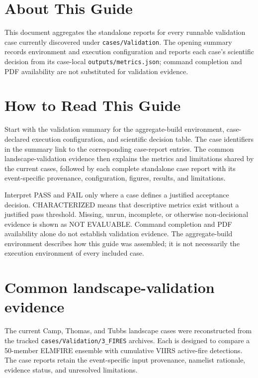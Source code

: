 \documentclass[12pt]{article}
\begin{document}
\newcommand{\GuideTitle}{ELMFIRE Validation Guide}



\section*{About This Guide}
{}
This document aggregates the standalone reports for every runnable validation
case currently discovered under \texttt{cases/Validation}.  The opening summary
records environment and execution configuration and reports each case's
scientific decision from its case-local \texttt{outputs/metrics.json}; command
completion and PDF availability are not substituted for validation evidence.

\clearpage
\tableofcontents
\clearpage

\section{How to Read This Guide}

Start with the validation summary for the aggregate-build environment,
case-declared execution configuration, and scientific decision table.  The
case identifiers in the summary link to the corresponding case-report entries.
The common landscape-validation evidence then explains the metrics and
limitations shared by the current cases, followed by each complete standalone
case report with its event-specific provenance, configuration, figures,
results, and limitations.

Interpret PASS and FAIL only where a case defines a justified acceptance
decision.  CHARACTERIZED means that descriptive metrics exist without a
justified pass threshold.  Missing, unrun, incomplete, or otherwise
non-decisional evidence is shown as NOT EVALUABLE.  Command completion and PDF
availability alone do not establish validation evidence.  The aggregate-build
environment describes how this guide was assembled; it is not necessarily the
execution environment of every included case.



\section{Common landscape-validation evidence}

The current Camp, Thomas, and Tubbs landscape cases were reconstructed from the
tracked \texttt{cases/Validation/3\_FIRES} archives.  Each is designed to
compare a 50-member ELMFIRE ensemble with cumulative VIIRS active-fire
detections.  The case reports retain the event-specific input provenance,
namelist rationale, evidence status, and unresolved limitations.
\end{document}
